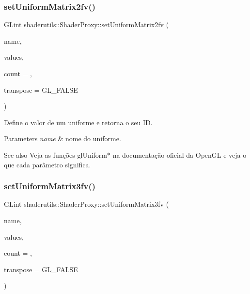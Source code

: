 \subsubsection{\texorpdfstring{set\+Uniform\+Matrix2fv()}{setUniformMatrix2fv()}}
{\footnotesize\ttfamily G\+Lint shaderutils\+::\+Shader\+Proxy\+::set\+Uniform\+Matrix2fv (\begin{DoxyParamCaption}\item[{const char $\ast$}]{name,  }\item[{const G\+Lfloat $\ast$}]{values,  }\item[{G\+Luint}]{count = {},  }\item[{G\+Lboolean}]{transpose = {\ttfamily GL\+\_\+FALSE} }\end{DoxyParamCaption})\hspace{0.3cm}{\ttfamily [inline]}}

Define o valor de um uniforme e retorna o seu ID. 
\begin{DoxyParams}{Parameters}
{\em name} & nome do uniforme. \\
\hline
\end{DoxyParams}
\begin{DoxySeeAlso}{See also}
Veja as funções gl\+Uniform$\ast$ na documentação oficial da Open\+GL e veja o que cada parâmetro significa. 
\end{DoxySeeAlso}
\mbox{\label{classshaderutils_1_1_shader_proxy_a4f54eb9942ebbfd3f681c9c5a1c6bb77}} 
\subsubsection{\texorpdfstring{set\+Uniform\+Matrix3fv()}{setUniformMatrix3fv()}}
{\footnotesize\ttfamily G\+Lint shaderutils\+::\+Shader\+Proxy\+::set\+Uniform\+Matrix3fv (\begin{DoxyParamCaption}\item[{const char $\ast$}]{name,  }\item[{const G\+Lfloat $\ast$}]{values,  }\item[{G\+Luint}]{count = {},  }\item[{G\+Lboolean}]{transpose = {\ttfamily GL\+\_\+FALSE} }\end{DoxyParamCaption})\hspace{0.3cm}{\ttfamily [inline]}}

